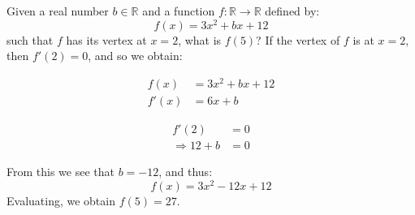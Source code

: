 \documentclass[crop=false,class=book,oneside]{standalone}
\begin{document}
            \begin{lexample}
                Given a real number $b\in\mathbb{R}$ and a function
                $f:\mathbb{R}\rightarrow\mathbb{R}$ defined by:
                \begin{equation}
                    f(x)=3x^{2}+bx+12
                \end{equation}
                such that $f$ has its vertex at $x=2$, what is $f(5)$?
                If the vertex of $f$ is at $x=2$, then $f'(2)=0$,
                and so we obtain:
                \par
                \begin{minipage}[b]{0.49\textwidth}
                    \begin{align}
                        f(x)&=3x^{2}+bx+12\\
                        f'(x)&=6x+b
                    \end{align}
                \end{minipage}
                \hfill
                \begin{minipage}[b]{0.49\textwidth}
                    \begin{align}
                        f'(2)&=0\\
                        \Rightarrow
                        12+b&=0
                    \end{align}
                \end{minipage}
                \par
                From this we see that $b=-12$, and thus:
                \begin{equation}
                    f(x)=3x^{2}-12x+12
                \end{equation}
                Evaluating, we obtain $f(5)=27$.
            \end{lexample}
\end{document}
